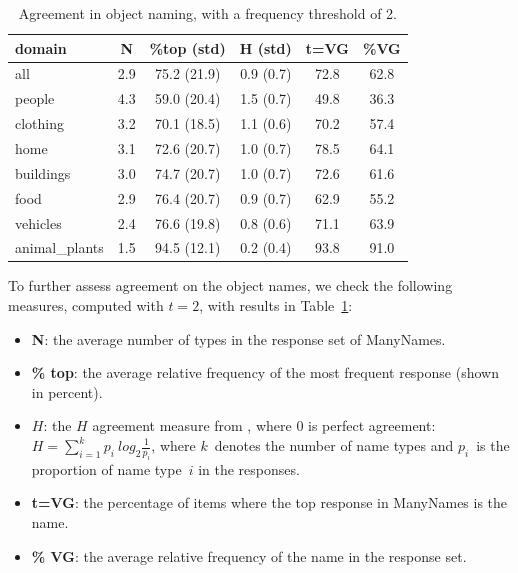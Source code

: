 \begin{table}
\centering
\begin{tabular}{lccccc}
  \toprule
  domain &    N &         \%top (std) &          H (std) & t=VG &   \%VG \\
  \midrule
  all &  2.9 &  75.2 (21.9) &  0.9 (0.7) &   72.8 &  62.8 \\
  \midrule
  people &  4.3 &  59.0 (20.4) &  1.5 (0.7) &   49.8 &  36.3 \\
  clothing &  3.2 &  70.1 (18.5) &  1.1 (0.6) &   70.2 &  57.4\\
  home &  3.1 &  72.6 (20.7) &  1.0 (0.7) &   78.5 &  64.1 \\
  buildings &  3.0 &  74.7 (20.7) &  1.0 (0.7) &   72.6 &  61.6\\
  food &  2.9 &  76.4 (20.7) &  0.9 (0.7) &   62.9 &  55.2 \\
  vehicles &  2.4 &  76.6 (19.8) &  0.8 (0.6) &   71.1 &  63.9 \\
  animal\_plants &  1.5 &  94.5 (12.1) &  0.2 (0.4) &   93.8 &  91.0\\
\bottomrule
\end{tabular}
\vspace{-0.3cm}
\caption{Agreement in object naming, with a frequency threshold of 2.}
\label{tab:agree}
\end{table}

To further assess agreement on the object names, we check the following measures, computed with $t=2$, with results in Table~\ref{tab:agree}:
\begin{itemize}
\item \textbf{N}: the average number of types in the response set of ManyNames.
\item \textbf{\% top}: the average relative frequency of the most frequent response (shown in percent).
\item \textbf{$H$}: the $H$ agreement measure from \cite{snodgrass}, where 0 is perfect agreement: \mbox{$H = \sum_{i=1}^k p_i~log_2\frac{1}{p_i}$}, 
where $k$\ denotes the number of name types and $p_i$\ is the proportion of name type\ $i$ in the responses. 
\item \textbf{t=VG}: the percentage of items where the top response in ManyNames is the \vg name.
\item \textbf{\% VG}: the average relative frequency of the \vg name in the response set.
\end{itemize}

